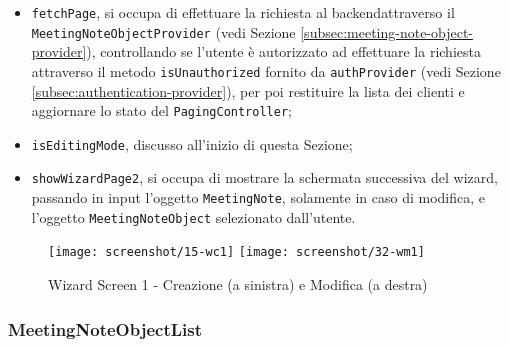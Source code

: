 \begin{itemize}
    \item \lstinline{fetchPage}, si occupa di effettuare la richiesta al \gls{backend}\glsoccur attraverso il \lstinline{MeetingNoteObjectProvider} (vedi Sezione \ref{subsec:meeting-note-object-provider}), controllando se l'utente è autorizzato ad effettuare la richiesta attraverso il metodo \lstinline{isUnauthorized} fornito da \lstinline{authProvider} (vedi Sezione \ref{subsec:authentication-provider}), per poi restituire la lista dei clienti e aggiornare lo stato del \lstinline{PagingController};
    \item \lstinline{isEditingMode}, discusso all'inizio di questa Sezione;
    \item \lstinline{showWizardPage2}, si occupa di mostrare la schermata successiva del \gls{wizard}\glsoccur, passando in input l'oggetto \lstinline{MeetingNote}, solamente in caso di modifica, e l'oggetto \lstinline{MeetingNoteObject} selezionato dall'utente.
\end{itemize}

\begin{figure}[!h] 
    \centering 
    \texttt{[image: screenshot/15-wc1]}
    \hfill
    \texttt{[image: screenshot/32-wm1]} 
    \caption{Wizard Screen 1 - Creazione (a sinistra) e Modifica (a destra)}
    \label{fig:w1}
\end{figure}

\subsubsection*{MeetingNoteObjectList}
\label{subsubsec:meeting-note-object-list}

